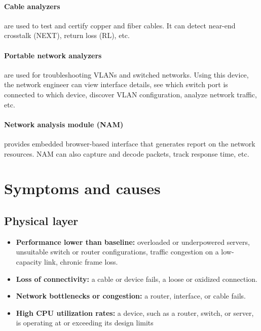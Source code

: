 \paragraph{Cable analyzers} are used to test and certify copper and fiber cables. It can detect near-end crosstalk (NEXT), return loss (RL), etc.

\paragraph{Portable network analyzers} are used for troubleshooting VLANs and switched networks. Using this device, the network engineer can view interface details, see which switch port is connected to which device, discover VLAN configuration, analyze network traffic, etc.

\paragraph{Network analysis module (NAM)} provides embedded browser-based interface that generates report on the network resources. NAM can also capture and decode packets, track response time, etc.

\section{Symptoms and causes}

\subsection{Physical layer}

\begin{itemize}
\item \textbf{Performance lower than baseline:} overloaded or underpowered servers, unsuitable switch or router configurations, traffic congestion on a low-capacity link, chronic frame loss.

\item \textbf{Loss of connectivity:} a cable or device fails, a loose or oxidized connection.

\item \textbf{Network bottlenecks or congestion:} a router, interface, or cable fails.

\item \textbf{High CPU utilization rates:} a device, such as a router, switch, or server, is operating at or exceeding its design limits
\end{itemize}


